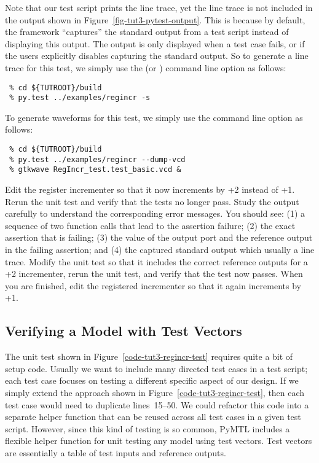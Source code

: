 \documentclass{cbxdoc}
\begin{document}
Note that our test script prints the line trace, yet the line trace is
not included in the output shown in Figure~\ref{fig-tut3-pytest-output}.
This is because by default, the  framework ``captures'' the
standard output from a test script instead of displaying this output. The
output is only displayed when a test case fails, or if the users
explicitly disables capturing the standard output. So to generate a line
trace for this test, we simply use the  (or )
command line option as follows:

\begin{verbatim}
 % cd ${TUTROOT}/build
 % py.test ../examples/regincr -s
\end{verbatim}

To generate waveforms for this test, we simply use the 
command line option as follows:

\begin{verbatim}
 % cd ${TUTROOT}/build
 % py.test ../examples/regincr --dump-vcd
 % gtkwave RegIncr_test.test_basic.vcd &
\end{verbatim}

\begin{task}
  Edit the register incrementer so that it now increments by +2 instead
  of +1. Rerun the unit test and verify that the tests no longer pass.
  Study the output carefully to understand the corresponding error
  messages. You should see: (1) a sequence of two function calls that
  lead to the assertion failure; (2) the exact assertion that is failing;
  (3) the value of the output port and the reference output in the
  failing assertion; and (4) the captured standard output which usually a
  line trace. Modify the unit test so that it includes the correct
  reference outputs for a +2 incrementer, rerun the unit test, and verify
  that the test now passes. When you are finished, edit the registered
  incrementer so that it again increments by +1.
\end{task}

\subsection{Verifying a Model with Test Vectors}

The unit test shown in Figure~\ref{code-tut3-regincr-test} requires quite
a bit of setup code. Usually we want to include many directed test cases
in a test script; each test case focuses on testing a different specific
aspect of our design. If we simply extend the approach shown in
Figure~\ref{code-tut3-regincr-test}, then each test case would need to
duplicate lines~15--50. We could refactor this code into a separate
helper function that can be reused across all test cases in a given test
script. However, since this kind of testing is so common, PyMTL includes
a flexible helper function for unit testing any model using test vectors.
Test vectors are essentially a table of test inputs and reference outputs.
\end{document}
